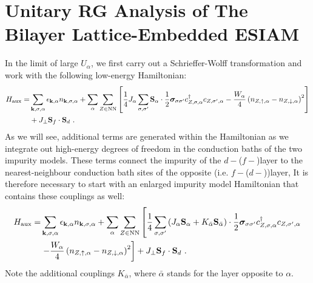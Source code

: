 
\section{Unitary RG Analysis of The Bilayer Lattice-Embedded ESIAM}
In the limit of large \(U_\alpha\), we first carry out a Schrieffer-Wolff transformation and work with the following low-energy Hamiltonian:
\begin{equation}\begin{aligned}
	H_\text{aux} =& \sum_{{\bf k},\sigma,\alpha}\epsilon_{{\bf k},\alpha}n_{{\bf k},\sigma,\alpha} + \sum_\alpha\sum_{Z \in \text{NN}}\left[\frac{1}{4}J_\alpha\sum_{\sigma,\sigma^\prime}{\bf S}_\alpha \cdot \frac{1}{2}{\boldsymbol{\sigma}}_{\sigma\sigma^\prime}c^\dagger_{Z,\sigma,\alpha}c_{Z,\sigma^\prime,\alpha} - \frac{W_\alpha}{4} \left(n_{Z,\uparrow,\alpha} - n_{Z,\downarrow,\alpha}\right)^2\right] \\
				 & + J_\perp {\bf S}_f \cdot {\bf S}_d~.
\end{aligned}\end{equation}
As we will see, additional terms are generated within the Hamiltonian as we integrate out high-energy degrees of freedom in the conduction baths of the two impurity models. These terms connect the impurity of the \(d-\)(\(f-\))layer to the nearest-neighbour conduction bath sites of the opposite (i.e. \(f-\)(\(d-\)))layer, It is therefore necessary to start with an enlarged impurity model Hamiltonian that contains these couplings as well:
\begin{equation}\begin{aligned}\label{expandedAux}
	H_\text{aux} =& \sum_{{\bf k},\sigma,\alpha}\epsilon_{{\bf k},\alpha}n_{{\bf k},\sigma,\alpha} + \sum_\alpha\sum_{Z \in \text{NN}}\left[\frac{1}{4}\sum_{\sigma,\sigma^\prime}\left(J_\alpha {\bf S}_\alpha + K_{\bar\alpha}{\bf S}_{\bar\alpha} \right)\cdot \frac{1}{2}{\boldsymbol{\sigma}}_{\sigma\sigma^\prime}c^\dagger_{Z,\sigma,\alpha}c_{Z,\sigma^\prime,\alpha} \right.\\
				 &\left. - \frac{W_\alpha}{4} \left(n_{Z,\uparrow,\alpha} - n_{Z,\downarrow,\alpha}\right)^2\right] + J_\perp{\bf S}_f \cdot {\bf S}_d~.
\end{aligned}\end{equation}
Note the additional couplings \(K_{\bar\alpha}\), where \(\bar\alpha\) stands for the layer opposite to \(\alpha\).

